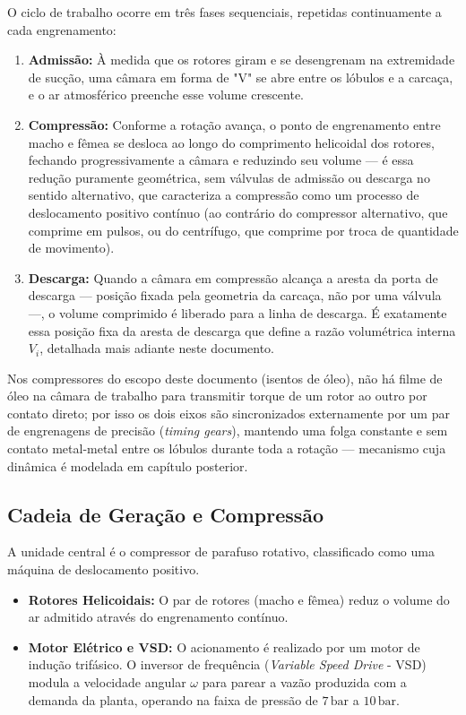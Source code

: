 \documentclass[12pt,a4paper]{article}
\numberwithin{equation}{section}
\numberwithin{table}{section}
\numberwithin{figure}{section}
\begin{document}
	O ciclo de trabalho ocorre em três fases sequenciais, repetidas continuamente a cada engrenamento:
	\begin{enumerate}
		\item \textbf{Admissão:} À medida que os rotores giram e se desengrenam na extremidade de sucção, uma câmara em forma de "V" se abre entre os lóbulos e a carcaça, e o ar atmosférico preenche esse volume crescente.
		\item \textbf{Compressão:} Conforme a rotação avança, o ponto de engrenamento entre macho e fêmea se desloca ao longo do comprimento helicoidal dos rotores, fechando progressivamente a câmara e reduzindo seu volume — é essa redução puramente geométrica, sem válvulas de admissão ou descarga no sentido alternativo, que caracteriza a compressão como um processo de deslocamento positivo contínuo (ao contrário do compressor alternativo, que comprime em pulsos, ou do centrífugo, que comprime por troca de quantidade de movimento).
		\item \textbf{Descarga:} Quando a câmara em compressão alcança a aresta da porta de descarga — posição fixada pela geometria da carcaça, não por uma válvula —, o volume comprimido é liberado para a linha de descarga. É exatamente essa posição fixa da aresta de descarga que define a razão volumétrica interna $V_i$, detalhada mais adiante neste documento.
	\end{enumerate}
	Nos compressores do escopo deste documento (isentos de óleo), não há filme de óleo na câmara de trabalho para transmitir torque de um rotor ao outro por contato direto; por isso os dois eixos são sincronizados externamente por um par de engrenagens de precisão (\textit{timing gears}), mantendo uma folga constante e sem contato metal-metal entre os lóbulos durante toda a rotação — mecanismo cuja dinâmica é modelada em capítulo posterior.

	\subsection{\textbf{Cadeia de Geração e Compressão}}
	A unidade central é o compressor de parafuso rotativo, classificado como uma máquina de deslocamento positivo.
	\begin{itemize}
		\item \textbf{Rotores Helicoidais:} O par de rotores (macho e fêmea) reduz o volume do ar admitido através do engrenamento contínuo.
		\item \textbf{Motor Elétrico e VSD:} O acionamento é realizado por um motor de indução trifásico. O inversor de frequência (\textit{Variable Speed Drive} - VSD) modula a velocidade angular $\omega$ para parear a vazão produzida com a demanda da planta, operando na faixa de pressão de $7\,\text{bar}$ a $10\,\text{bar}$.
	\end{itemize}
	
\end{document}
